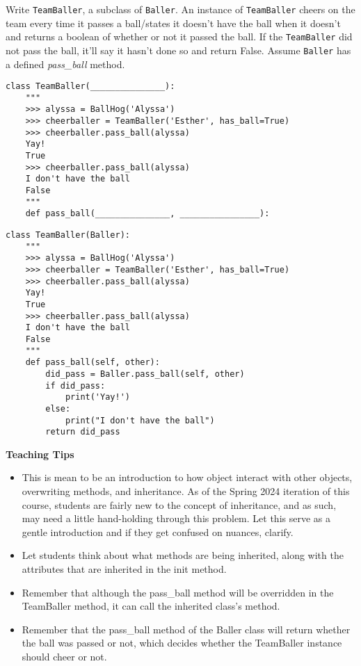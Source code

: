 \begin{blocksection}
\question Write \lstinline$TeamBaller$, a subclass of \lstinline$Baller$. An instance of \lstinline$TeamBaller$ cheers on the team every time it passes a ball/states it doesn't have the ball when it doesn't and returns a boolean of whether or not it passed the ball. If the \lstinline$TeamBaller$ did not pass the ball, it'll say it hasn't done so and return False. Assume \lstinline$Baller$ has a defined \textit{pass\_ball} method.

\ifprintanswers\else
\begin{lstlisting}
class TeamBaller(_______________):
    """
    >>> alyssa = BallHog('Alyssa')
    >>> cheerballer = TeamBaller('Esther', has_ball=True)
    >>> cheerballer.pass_ball(alyssa)
    Yay! 
    True 
    >>> cheerballer.pass_ball(alyssa)
    I don't have the ball 
    False 
    """
    def pass_ball(_______________, ________________):
\end{lstlisting}
\fi

\begin{solution}[1in]
\begin{lstlisting}
class TeamBaller(Baller):
    """
    >>> alyssa = BallHog('Alyssa')
    >>> cheerballer = TeamBaller('Esther', has_ball=True)
    >>> cheerballer.pass_ball(alyssa)
    Yay!
    True
    >>> cheerballer.pass_ball(alyssa)
    I don't have the ball
    False
    """
    def pass_ball(self, other):
        did_pass = Baller.pass_ball(self, other)
        if did_pass:
            print('Yay!')
        else:
            print("I don't have the ball")
        return did_pass
\end{lstlisting}
\end{solution}

\begin{guide}
\begin{blocksection}
\textbf{Teaching Tips}
    \begin{itemize}
    \item This is mean to be an introduction to how object interact with other objects, overwriting methods, and inheritance. As of the Spring 2024 iteration of this course, students are fairly new to the concept of inheritance, and as such, may need a little hand-holding through this problem. Let this serve as a gentle introduction and if they get confused on nuances, clarify.
    \item Let students think about what methods are being inherited, along with the attributes that are inherited in the init method.
    \item Remember that although the pass\_ball method will be overridden in the TeamBaller method, it can call the inherited class's method.
    \item Remember that the pass\_ball method of the Baller class will return whether the ball was passed or not, which decides whether the TeamBaller instance should cheer or not.
    \end{itemize}
\end{blocksection}
\end{guide}

\end{blocksection}